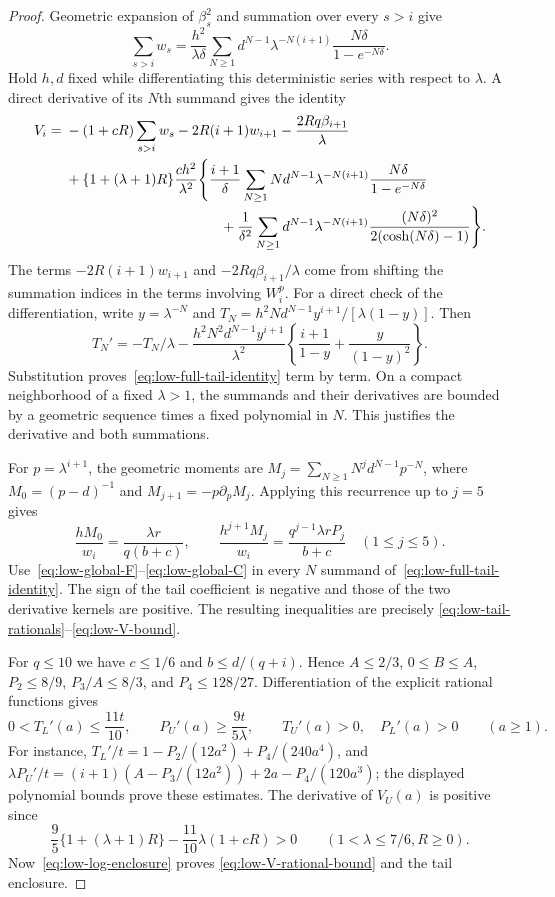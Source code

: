 \begin{proof}
Geometric expansion of $\beta_s^2$ and summation over every $s>i$ give
\[
 \sum_{s>i}w_s=\frac{h^2}{\lambda\delta}
 \sum_{N\ge1}d^{N-1}\lambda^{-N(i+1)}
                         \frac{N\delta}{1-e^{-N\delta}}.
\]
Hold $h,d$ fixed while differentiating this deterministic series with
respect to $\lambda$.  A direct derivative of its $N$th summand gives
the identity
\begin{align}
 V_i={}&-(1+cR)\sum_{s>i}w_s-2R(i+1)w_{i+1}-\frac{2Rq\beta_{i+1}}\lambda
 \nonumber\\
 &+\{1+(\lambda+1)R\}\frac{ch^2}{\lambda^2}
 \Biggl\{\frac{i+1}{\delta}\sum_{N\ge1}N d^{N-1}\lambda^{-N(i+1)}
                                      \frac{N\delta}{1-e^{-N\delta}}
 \nonumber\\[-2pt]
 &\hspace{39mm}+\frac1{\delta^2}
 \sum_{N\ge1}d^{N-1}\lambda^{-N(i+1)}
                          \frac{(N\delta)^2}{2(\cosh(N\delta)-1)}\Biggr\}.
 \label{eq:low-full-tail-identity}
\end{align}
The terms $-2R(i+1)w_{i+1}$ and $-2Rq\beta_{i+1}/\lambda$ come from
shifting the summation indices in the terms involving $W_i^p$.
For a direct check of the differentiation, write
$y=\lambda^{-N}$ and
$T_N=h^2N d^{N-1}y^{i+1}/[\lambda(1-y)]$.  Then
\[
 T_N'=-T_N/\lambda-
 \frac{h^2N^2d^{N-1}y^{i+1}}{\lambda^2}
 \left\{\frac{i+1}{1-y}+\frac{y}{(1-y)^2}\right\}.
\]
Substitution proves~\eqref{eq:low-full-tail-identity} term by term.
On a compact neighborhood of a fixed $\lambda>1$, the summands and
their derivatives are bounded by a geometric sequence times a fixed
polynomial in $N$.  This justifies the derivative and both summations.

For $p=\lambda^{i+1}$, the geometric moments are
$M_j=\sum_{N\ge1}N^j d^{N-1}p^{-N}$, where
$M_0=(p-d)^{-1}$ and $M_{j+1}=-p\partial_p M_j$.
Applying this recurrence up to $j=5$ gives
\[
 \frac{hM_0}{w_i}=\frac{\lambda r}{q(b+c)},\qquad
 \frac{h^{j+1}M_j}{w_i}
    =\frac{q^{j-1}\lambda rP_j}{b+c}\quad(1\le j\le5).
\]
Use~\eqref{eq:low-global-F}--\eqref{eq:low-global-C} in every
$N$ summand of~\eqref{eq:low-full-tail-identity}.  The sign of the
tail coefficient is negative and those of the two derivative kernels
are positive.  The resulting inequalities are precisely
\eqref{eq:low-tail-rationals}--\eqref{eq:low-V-bound}.

For $q\le10$ we have $c\le1/6$ and
$b\le d/(q+i)$.  Hence $A\le2/3$, $0\le B\le A$,
$P_2\le8/9$, $P_3/A\le8/3$, and $P_4\le128/27$.
Differentiation of the explicit rational functions gives
\[
 0<T_L'(a)\le\frac{11t}{10},\qquad
 P_U'(a)\ge\frac{9t}{5\lambda},\qquad
 T_U'(a)>0,\quad P_L'(a)>0\qquad(a\ge1).
\]
For instance, $T_L'/t=1-P_2/(12a^2)+P_4/(240a^4)$,
and $\lambda P_U'/t=(i+1)(A-P_3/(12a^2))+2a-P_4/(120a^3)$;
the displayed polynomial bounds prove these estimates.
The derivative of $V_U(a)$ is positive since
\[
 \frac95\{1+(\lambda+1)R\}-\frac{11}{10}\lambda(1+cR)>0
 \qquad(1<\lambda\le7/6, R\ge0).
\]
Now~\eqref{eq:low-log-enclosure} proves
\eqref{eq:low-V-rational-bound} and the tail enclosure.


\end{proof}
